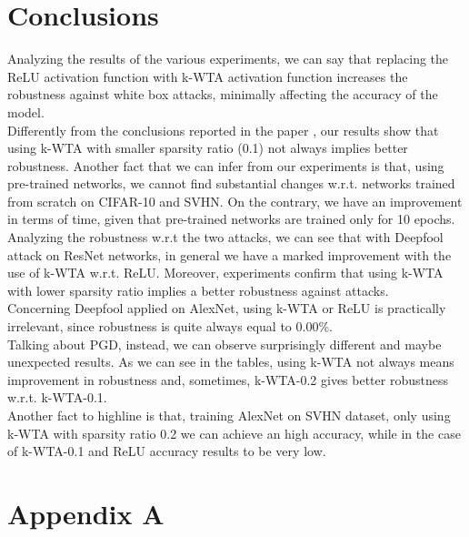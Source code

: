 \documentclass[a4paper]{article}
\begin{document}
	\section{Conclusions}
	Analyzing the results of the various experiments, we can say that replacing the ReLU activation function with k-WTA activation function increases the robustness against white box attacks, minimally affecting the accuracy of the model.\\
	Differently from the conclusions reported in the paper \cite{xiao2019resisting}, our results show that using k-WTA with smaller sparsity ratio (0.1) not always implies better robustness. Another fact that we can infer from our experiments is that, using pre-trained networks, we cannot find substantial changes w.r.t. networks trained from scratch on CIFAR-10 and SVHN. On the contrary, we have an improvement in terms of time, given that pre-trained networks are trained only for 10 epochs.\\
	Analyzing the robustness w.r.t the two attacks, we can see that with Deepfool attack on ResNet networks, in general we have a marked improvement with the use of k-WTA w.r.t. ReLU. Moreover, experiments confirm that using k-WTA with lower sparsity ratio implies a better robustness against attacks.\\
	Concerning Deepfool applied on AlexNet, using k-WTA or ReLU is practically irrelevant, since robustness is quite always equal to 0.00\%.\\
	Talking about PGD, instead, we can observe surprisingly different and maybe unexpected results. As we can see in the tables, using k-WTA not always means improvement in robustness and, sometimes, k-WTA-0.2 gives better robustness w.r.t. k-WTA-0.1.\\
	Another fact to highline is that, training AlexNet on SVHN dataset, only using k-WTA with sparsity ratio 0.2 we can achieve an high accuracy, while in the case of k-WTA-0.1 and ReLU accuracy results to be very low.
	
	\section{Appendix A}
\end{document}
